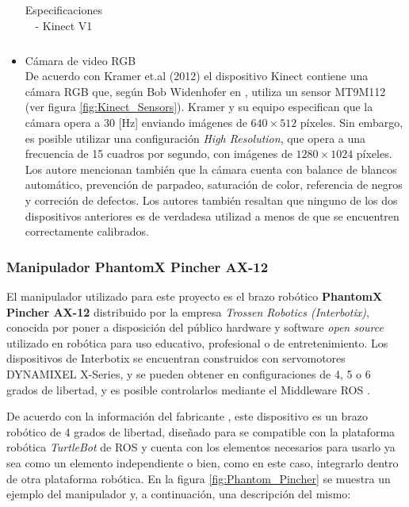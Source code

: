 \begin{itemize}
\begin{table}
\begin{tabular}{|c|c|}
                \hline
                \end{tabular}
                \caption{Especificaciones - Kinect V1}
                \label{tab:Kinect_especs}
            \end{table}

            \item Cámara de video RGB \\
            De acuerdo con Kramer et.al (2012) \cite{kramer_hacking_2012} el dispositivo Kinect contiene una cámara RGB que, según Bob Widenhofer en \cite{eetimes_inside_2010}, utiliza un sensor MT9M112 (ver figura \ref{fig:Kinect_Sensors}). Kramer y su equipo especifican que la cámara opera a 30 [Hz] enviando imágenes de $640\times512$ píxeles. Sin embargo, es posible utilizar una configuración \textit{High Resolution}, que opera a una frecuencia de 15 cuadros por segundo, con imágenes de $1280\times1024$ píxeles. Los autore mencionan también que la cámara cuenta con balance de blancos automático, prevención de parpadeo, saturación de color, referencia de negros y correción de defectos. Los autores también resaltan que ninguno de los dos dispositivos anteriores es de verdadesa utilizad a menos de que se encuentren correctamente calibrados. 
            \end{itemize}
            
            \subsubsection{Manipulador PhantomX Pincher AX-12}
            El manipulador utilizado para este proyecto es el brazo robótico \textbf{PhantomX Pincher AX-12} distribuido por la empresa \textit{Trossen Robotics (Interbotix)}, conocida por poner a disposición del público hardware y software \textit{open source} utilizado en robótica para uso educativo, profesional o de entretenimiento. Los dispositivos de Interbotix se encuentran construidos con servomotores DYNAMIXEL X-Series, y se pueden obtener en configuraciones de 4, 5 o 6 grados de libertad, y es posible controlarlos mediante el Middleware ROS \cite{Interbotix_interbotix}. 
            
            De acuerdo con la información del fabricante \cite{Interbotix_widowx_PincherArm}, este dispositivo es un brazo robótico de 4 grados de libertad, diseñado para se compatible con la plataforma robótica \textit{TurtleBot} de ROS y cuenta con los elementos necesarios para usarlo ya sea como un elemento independiente o bien, como en este caso, integrarlo dentro de otra plataforma robótica. En la figura \ref{fig:Phantom_Pincher} se muestra un ejemplo del manipulador y, a continuación, una descripción del mismo:
            \phantom{saltodelineaforzado >:D}\\
            
